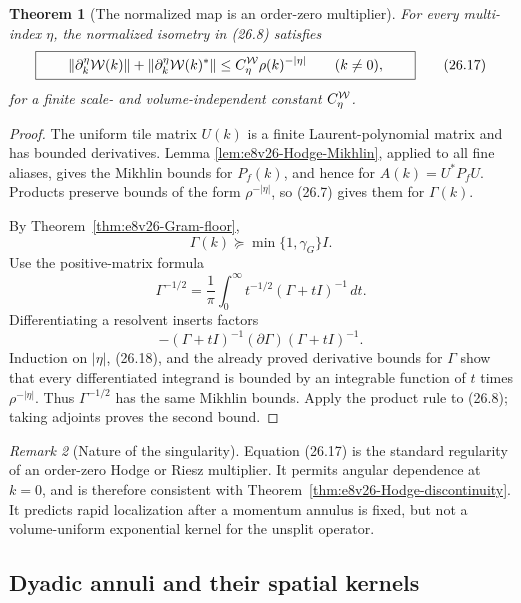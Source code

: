 \documentclass[11pt,oneside]{book}
\newtheorem{theorem}{Theorem}[chapter]
\theoremstyle{definition}
\theoremstyle{remark}
\newtheorem{remark}[theorem]{Remark}
\begin{document}
\begin{theorem}[The normalized map is an order-zero multiplier]
\label{thm:e8v26-W-Mikhlin}
For every multi-index \(\eta\), the normalized isometry in (26.8)
satisfies
\[
\boxed{\qquad
 \|\partial_k^\eta{\cal W}(k)\|
 +\|\partial_k^\eta{\cal W}(k)^*\|
 \leq C_\eta^{\cal W}\rho(k)^{-|\eta|}
 \qquad(k\ne0),
\qquad}                                                           \tag{26.17}
\]
for a finite scale- and volume-independent constant
\(C_\eta^{\cal W}\).
\end{theorem}

\begin{proof}
The uniform tile matrix \(U(k)\) is a finite Laurent-polynomial
matrix and has bounded derivatives.  Lemma
\ref{lem:e8v26-Hodge-Mikhlin}, applied to all fine aliases, gives the
Mikhlin bounds for \(P_f(k)\), and hence for
\(A(k)=U^*P_fU\).  Products preserve bounds of the form
\(\rho^{-|\eta|}\), so (26.7) gives them for \(\Gamma(k)\).

By Theorem~\ref{thm:e8v26-Gram-floor},
\[
                  \Gamma(k)\succeq
                  \min\{1,\gamma_G\}I.                            \tag{26.18}
\]
Use the positive-matrix formula
\[
 \Gamma^{-1/2}
 =\frac1\pi\int_0^\infty
       t^{-1/2}(\Gamma+tI)^{-1}\,dt.                              \tag{26.19}
\]
Differentiating a resolvent inserts factors
\[
 -(\Gamma+tI)^{-1}(\partial\Gamma)(\Gamma+tI)^{-1}.
\]
Induction on \(|\eta|\), (26.18), and the already proved derivative
bounds for \(\Gamma\) show that every differentiated integrand is
bounded by an integrable function of \(t\) times
\(\rho^{-|\eta|}\).  Thus \(\Gamma^{-1/2}\) has the same Mikhlin
bounds.  Apply the product rule to (26.8); taking adjoints proves the
second bound.
\end{proof}

\begin{remark}[Nature of the singularity]
\label{rem:e8v26-order-zero}
Equation (26.17) is the standard regularity of an order-zero Hodge or
Riesz multiplier.  It permits angular dependence at \(k=0\), and is
therefore consistent with
Theorem~\ref{thm:e8v26-Hodge-discontinuity}.  It predicts rapid
localization after a momentum annulus is fixed, but not a
volume-uniform exponential kernel for the unsplit operator.
\end{remark}

\subsection{Dyadic annuli and their spatial kernels}
\end{document}
